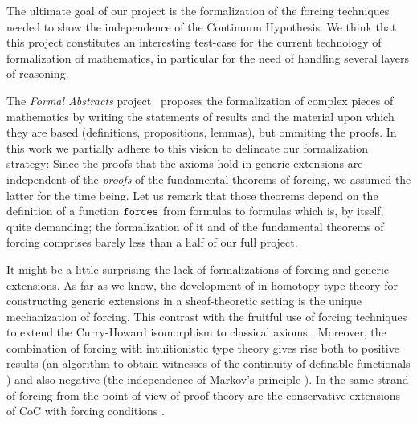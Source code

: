 The
ultimate goal of our project is the formalization of the forcing
techniques needed to show the independence of the Continuum
Hypothesis. 
We think that this project constitutes an interesting test-case
for the current technology of formalization of mathematics, in
particular for the need of handling several layers of reasoning. 

The \emph{Formal Abstracts} project~\cite{hales-fabstracts} proposes
the formalization of complex pieces of mathematics by writing the
statements of 
results and the material upon which they are based (definitions,
propositions, lemmas), but ommiting the proofs. In this work we
partially adhere to this vision to delineate our formalization
strategy:
Since the proofs that the  axioms hold in generic extensions
are independent of the \emph{proofs} of the fundamental theorems of
forcing, we assumed the latter for the time being. Let us remark
that those theorems depend on the definition of a function $\mathop{\mathtt{forces}}$
from formulas to formulas which is, by itself, quite demanding; the
formalization of it and of the fundamental theorems of forcing %
comprises barely less than a half of our full project.

It might be a little surprising the lack of formalizations of forcing
and generic extensions. As far as we know, the development of
\citet{JFR6232} in homotopy type theory for constructing generic
extensions in a sheaf-theoretic setting is the unique mechanization of
forcing. This contrast with the fruitful use of forcing techniques to
extend the Curry-Howard isomorphism to classical axioms
\cite{Miquel:2011:FPT:2058525.2059614,lmcs:1070}. Moreover, the
combination of forcing with intuitionistic type theory
\cite{Coquand:2009:FTT:1807662.1807665,coquand2010note} gives rise
both to positive results (an algorithm to obtain witnesses of the
continuity of definable functionals \cite{coquand2012computational})
and also negative (the independence of Markov's principle
\cite{lmcs:3859}). In the same strand of forcing from the point of
view of proof theory \cite{avigad_2004} are the conservative
extensions of CoC with forcing conditions
\cite{jaber:hal-01319066,Jaber:2012:ETT:2358958.2359524}.


